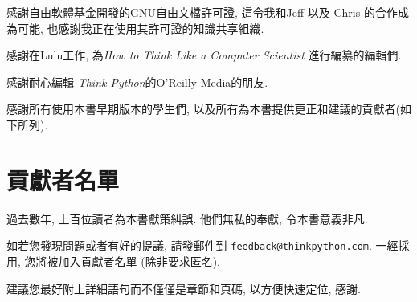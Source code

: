 \documentclass[10pt]{book}
\begin{document}
感謝自由軟體基金開發的GNU自由文檔許可證, 
這令我和Jeff 以及 Chris 的合作成為可能,
也感謝我正在使用其許可證的知識共享組織. 


感謝在Lulu工作, 為{\em How to Think Like a Computer Scientist}
進行編纂的編輯們. 

感謝耐心編輯 {\em Think Python}的O'Reilly Media的朋友. 

感謝所有使用本書早期版本的學生們, 以及所有為本書提供更正和建議的貢獻者(如下所列). 


\section*{貢獻者名單}

過去數年, 上百位讀者為本書獻策糾誤. 
他們無私的奉獻, 令本書意義非凡. 

如若您發現問題或者有好的提議, 請發郵件到 
{\tt feedback@thinkpython.com}. 一經採用, 您將被加入貢獻者名單
(除非要求匿名).

建議您最好附上詳細語句而不僅僅是章節和頁碼, 以方便快速定位, 感謝. 
\end{document}
